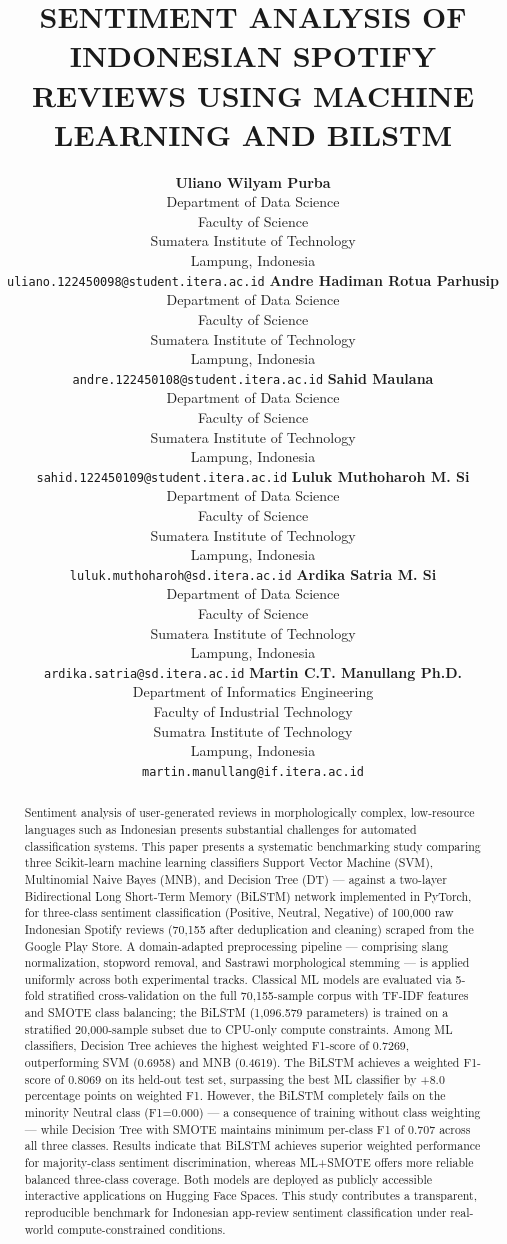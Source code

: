 \documentclass{article}
\title{SENTIMENT ANALYSIS OF INDONESIAN SPOTIFY REVIEWS USING MACHINE LEARNING AND BILSTM}
\author{%
  \textbf{Uliano Wilyam Purba}\\
  Department of Data Science\\
  Faculty of Science\\
  Sumatera Institute of Technology\\
  Lampung, Indonesia\\
  \texttt{uliano.122450098@student.itera.ac.id}
  \And
  \textbf{Andre Hadiman Rotua Parhusip}\\
  Department of Data Science\\
  Faculty of Science\\
  Sumatera Institute of Technology\\
  Lampung, Indonesia\\
  \texttt{andre.122450108@student.itera.ac.id}
  \And
  \textbf{Sahid Maulana}\\
  Department of Data Science\\
  Faculty of Science\\
  Sumatera Institute of Technology\\
  Lampung, Indonesia\\
  \texttt{sahid.122450109@student.itera.ac.id}
  \And
  \textbf{Luluk Muthoharoh M. Si}\\
  Department of Data Science\\
  Faculty of Science\\
  Sumatera Institute of Technology\\
  Lampung, Indonesia\\
  \texttt{luluk.muthoharoh@sd.itera.ac.id}
  \And
  \textbf{Ardika Satria M. Si}\\
  Department of Data Science\\
  Faculty of Science\\
  Sumatera Institute of Technology\\
  Lampung, Indonesia\\
  \texttt{ardika.satria@sd.itera.ac.id}
  \And
  \textbf{Martin C.T. Manullang Ph.D.}\\
  Department of Informatics Engineering\\
  Faculty of Industrial Technology\\
  Sumatra Institute of Technology\\
  Lampung, Indonesia\\
  \texttt{martin.manullang@if.itera.ac.id}\\
}
\begin{document}
\maketitle

\begin{abstract}
Sentiment analysis of user-generated reviews in morphologically complex, low-resource languages such as Indonesian presents substantial challenges for automated classification systems. This paper presents a systematic benchmarking study comparing three Scikit-learn machine learning classifiers Support Vector Machine (SVM), Multinomial Naive Bayes (MNB), and Decision Tree (DT) --- against a two-layer Bidirectional Long Short-Term Memory (BiLSTM) network implemented in PyTorch, for three-class sentiment classification (Positive, Neutral, Negative) of 100,000 raw Indonesian Spotify reviews (70,155 after deduplication and cleaning) scraped from the Google Play Store. A domain-adapted preprocessing pipeline --- comprising slang normalization, stopword removal, and Sastrawi morphological stemming --- is applied uniformly across both experimental tracks. Classical ML models are evaluated via 5-fold stratified cross-validation on the full 70,155-sample corpus with TF-IDF features and SMOTE class balancing; the BiLSTM (1,096.579 parameters) is trained on a stratified 20,000-sample subset due to CPU-only compute constraints. Among ML classifiers, Decision Tree achieves the highest weighted F1-score of 0.7269, outperforming SVM (0.6958) and MNB (0.4619). The BiLSTM achieves a weighted F1-score of 0.8069 on its held-out test set, surpassing the best ML classifier by +8.0 percentage points on weighted F1. However, the BiLSTM completely fails on the minority Neutral class (F1=0.000) --- a consequence of training without class weighting --- while Decision Tree with SMOTE maintains minimum per-class F1 of 0.707 across all three classes. Results indicate that BiLSTM achieves superior weighted performance for majority-class sentiment discrimination, whereas ML+SMOTE offers more reliable balanced three-class coverage. Both models are deployed as publicly accessible interactive applications on Hugging Face Spaces. This study contributes a transparent, reproducible benchmark for Indonesian app-review sentiment classification under real-world compute-constrained conditions.
\end{abstract}

\end{document}
